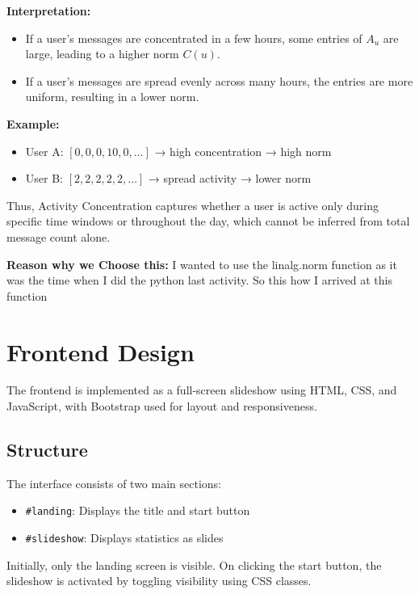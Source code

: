 \documentclass[12pt]{article}
\begin{document}
\textbf{Interpretation:}

\begin{itemize}
\item If a user's messages are concentrated in a few hours, some entries of $A_u$ are large, leading to a higher norm $C(u)$.
\item If a user's messages are spread evenly across many hours, the entries are more uniform, resulting in a lower norm.
\end{itemize}

\textbf{Example:}

\begin{itemize}
\item User A: $[0,0,0,10,0,\ldots]$ → high concentration → high norm
\item User B: $[2,2,2,2,2,\ldots]$ → spread activity → lower norm
\end{itemize}

Thus, Activity Concentration captures whether a user is active only during specific time windows or throughout the day, which cannot be inferred from total message count alone.

\textbf {Reason why we Choose this:} I wanted to use the linalg.norm function as it was the time when I did the python last activity. So this how I arrived at this function

\section{Frontend Design}

The frontend is implemented as a full-screen slideshow using HTML, CSS, and JavaScript, with Bootstrap used for layout and responsiveness.

\subsection{Structure}

The interface consists of two main sections:
\begin{itemize}
\item \texttt{#landing}: Displays the title and start button
\item \texttt{#slideshow}: Displays statistics as slides
\end{itemize}

Initially, only the landing screen is visible. On clicking the start button, the slideshow is activated by toggling visibility using CSS classes. 
\end{document}
